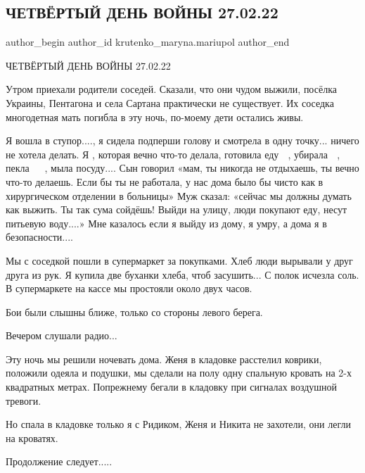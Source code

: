  
 
 
 
 

\subsection{ЧЕТВЁРТЫЙ ДЕНЬ ВОЙНЫ 27.02.22}
\label{sec:27_02_2023.fb.krutenko_maryna.mariupol.1.chetvyortii_den_voin}

\ifcmt
 author_begin
   author_id krutenko_maryna.mariupol
 author_end
\fi

ЧЕТВЁРТЫЙ ДЕНЬ ВОЙНЫ 27.02.22

Утром приехали родители соседей. Сказали, что они чудом выжили, посёлка
Украины, Пентагона и села Сартана практически не существует. Их соседка
многодетная мать погибла в эту ночь, по-моему дети остались живы. 

Я вошла в ступор...., я сидела подперши голову и смотрела в одну точку... ничего не
хотела делать. Я , которая вечно что-то делала, готовила еду 🍜 , убирала 🧹 ,
пекла 🍪 🧁 , мыла посуду.... Сын говорил «мам, ты никогда не отдыхаешь, ты вечно
что-то делаешь. Если бы ты не работала, у нас дома было бы чисто как в
хирургическом отделении в больницы» Муж сказал: «сейчас мы должны думать как
выжить. Ты так сума сойдёшь! Выйди на улицу, люди покупают еду, несут питьевую
воду....» Мне казалось если я выйду из дому,  я умру, а дома я в безопасности....

Мы с соседкой пошли в супермаркет за покупками. Хлеб люди вырывали у друг друга
из рук. Я купила две буханки хлеба, чтоб засушить... С полок исчезла соль. В
супермаркете на кассе мы простояли около двух часов. 

Бои были слышны ближе, только со стороны левого берега. 

Вечером слушали радио...

Эту ночь мы решили ночевать дома. Женя в кладовке расстелил коврики, положили
одеяла и подушки, мы сделали на полу одну спальную кровать на 2-х квадратных
метрах. Попрежнему бегали в кладовку при сигналах воздушной тревоги. 

Но спала в кладовке только я с Ридиком, Женя и Никита не захотели, они легли на
кроватях.

Продолжение следует.....
